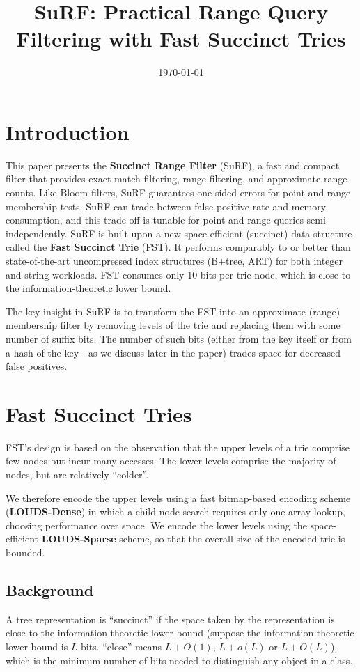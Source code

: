 \documentclass[11pt]{article}
\date{\today}
\title{SuRF: Practical Range Query Filtering with Fast Succinct Tries}
\begin{document}
\maketitle
\section{Introduction}
\label{sec:orgfb2d25f}
This paper presents the \textbf{Succinct Range Filter} (SuRF), a fast and compact filter that provides
exact-match filtering, range filtering, and approximate range counts. Like Bloom filters, SuRF
guarantees one-sided errors for point and range membership tests. SuRF can trade between false
positive rate and memory consumption, and this trade-off is tunable for point and range queries
semi-independently. SuRF is built upon a new space-efficient (succinct) data structure called the
\textbf{Fast Succinct Trie} (FST). It performs comparably to or better than state-of-the-art uncompressed index
structures (B+tree, ART) for both integer and string workloads. FST consumes only 10 bits per trie
node, which is close to the information-theoretic lower bound.

The key insight in SuRF is to transform the FST into an approximate (range) membership filter by
removing levels of the trie and replacing them with some number of suffix bits. The number of such
bits (either from the key itself or from a hash of the key—as we discuss later in the paper) trades
space for decreased false positives.
\section{Fast Succinct Tries}
\label{sec:orgdc6fb15}
FST’s design is based on the observation that the upper levels of a trie comprise few nodes but incur
many accesses. The lower levels comprise the majority of nodes, but are relatively ``colder''.

We therefore encode the upper levels using a fast bitmap-based encoding scheme (\textbf{LOUDS-Dense}) in which
a child node search requires only one array lookup, choosing performance over space. We encode the
lower levels using the space-efficient \textbf{LOUDS-Sparse} scheme, so that the overall size of the encoded
trie is bounded.
\subsection{Background}
\label{sec:org9761512}
A tree representation is “succinct” if the space taken by the representation is close to the
information-theoretic lower bound (suppose the information-theoretic lower bound is \(L\) bits.
``close'' means \(L+O(1)\), \(L+o(L)\) or \(L+O(L)\)), which is the minimum number of bits needed to distinguish any
object in a class.
\end{document}
